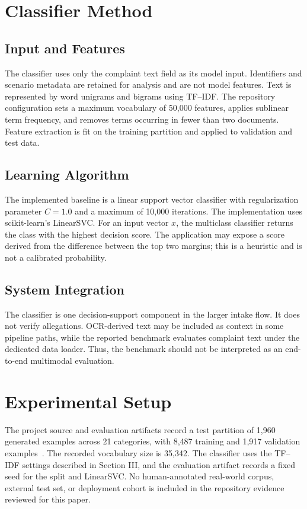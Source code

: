 \documentclass[conference]{IEEEtran}
\begin{document}
\section{Classifier Method}
\subsection{Input and Features}
The classifier uses only the complaint text field as its model input. Identifiers and scenario metadata are retained for analysis and are not model features. Text is represented by word unigrams and bigrams using TF--IDF. The repository configuration sets a maximum vocabulary of 50,000 features, applies sublinear term frequency, and removes terms occurring in fewer than two documents. Feature extraction is fit on the training partition and applied to validation and test data.

\subsection{Learning Algorithm}
The implemented baseline is a linear support vector classifier with regularization parameter $C=1.0$ and a maximum of 10,000 iterations. The implementation uses scikit-learn's LinearSVC. For an input vector $x$, the multiclass classifier returns the class with the highest decision score. The application may expose a score derived from the difference between the top two margins; this is a heuristic and is not a calibrated probability.

\subsection{System Integration}
The classifier is one decision-support component in the larger intake flow. It does not verify allegations. OCR-derived text may be included as context in some pipeline paths, while the reported benchmark evaluates complaint text under the dedicated data loader. Thus, the benchmark should not be interpreted as an end-to-end multimodal evaluation.

\section{Experimental Setup}
The project source and evaluation artifacts record a test partition of 1,960 generated examples across 21 categories, with 8,487 training and 1,917 validation examples~\cite{projectArtifacts}. The recorded vocabulary size is 35,342. The classifier uses the TF--IDF settings described in Section III, and the evaluation artifact records a fixed seed for the split and LinearSVC. No human-annotated real-world corpus, external test set, or deployment cohort is included in the repository evidence reviewed for this paper.
\end{document}
